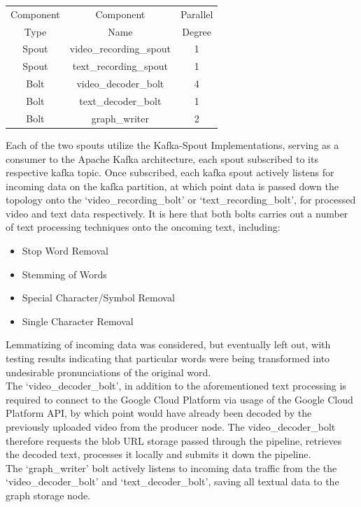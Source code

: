 \documentclass[10pt,conference]{IEEEtran}
\begin{document}
\begin{table}[h]
    \centering
    \begin{tabular}{|c|c|c|}
        \hline
        Component&Component&Parallel    \\
        Type&Name&Degree                \\ \hline
        Spout&video\_recording\_spout&1 \\ \hline
        Spout&text\_recording\_spout&1  \\ \hline
        Bolt&video\_decoder\_bolt&4     \\ \hline
        Bolt&text\_decoder\_bolt&1      \\ \hline
        Bolt&graph\_writer&2            \\ \hline
    \end{tabular}
    \label{tab:StormTopology}
\end{table}

Each of the two spouts utilize the Kafka-Spout Implementations, serving as a consumer to the Apache Kafka architecture, each spout subscribed to its respective kafka topic. Once subscribed, each kafka spout actively listens for incoming data on the kafka partition, at which point data is passed down the topology onto the ‘video\_recording\_bolt’ or ‘text\_recording\_bolt’, for processed video and text data respectively. It is here that both bolts carries out a number of text processing techniques onto the oncoming text, including:
\begin{itemize}
    \item Stop Word Removal
    \item Stemming of Words
    \item Special Character/Symbol Removal
    \item Single Character Removal
\end{itemize}

Lemmatizing of incoming data was considered, but eventually left out, with testing results indicating that particular words were being transformed into undesirable pronunciations of the original word.
\\
The ‘video\_decoder\_bolt’, in addition to the aforementioned text processing is required to connect to the Google Cloud Platform via usage of the Google Cloud Platform API, by which point would have already been decoded by the previously uploaded video from the producer node. The video\_decoder\_bolt therefore requests the blob URL storage passed through the pipeline, retrieves the decoded text, processes it locally and submits it down the pipeline.
\\
The ‘graph\_writer’ bolt actively listens to incoming data traffic from the the ‘video\_decoder\_bolt’ and ‘text\_decoder\_bolt’, saving all textual data to the graph storage node.
\end{document}
